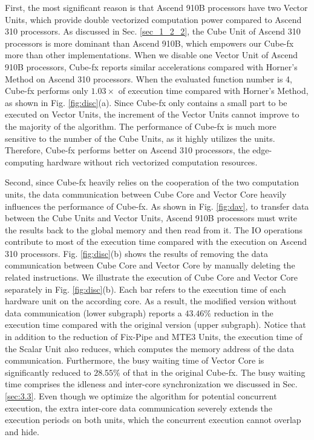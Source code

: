 First, the most significant reason is that Ascend 910B processors have two Vector Units, which provide double vectorized computation power compared to Ascend 310 processors. As discussed in Sec. \ref{sec_1_2_2}, the Cube Unit of Ascend 310 processors is more dominant than Ascend 910B, which empowers our Cube-fx more than other implementations. When we disable one Vector Unit of Ascend 910B processors, Cube-fx reports similar accelerations compared with Horner's Method on Ascend 310 processors. When the evaluated function number is 4, Cube-fx performs only $1.03\times$ of execution time compared with Horner's Method, as shown in Fig. \ref{fig:disc}(a). Since Cube-fx only contains a small part to be executed on Vector Units, the increment of the Vector Units cannot improve to the majority of the algorithm. The performance of Cube-fx is much more sensitive to the number of the Cube Units, as it highly utilizes the units. Therefore, Cube-fx performs better on Ascend 310 processors, the edge-computing hardware without rich vectorized computation resources.

Second, since Cube-fx heavily relies on the cooperation of the two computation units, the data communication between Cube Core and Vector Core heavily influences the performance of Cube-fx. As shown in Fig. \ref{fig:dav}, to transfer data between the Cube Units and Vector Units, Ascend 910B processors must write the results back to the global memory and then read from it. The IO operations contribute to most of the execution time compared with the execution on Ascend 310 processors. Fig. \ref{fig:disc}(b) shows the results of removing the data communication between Cube Core and Vector Core by manually deleting the related instructions. We illustrate the execution of Cube Core and Vector Core separately in Fig. \ref{fig:disc}(b). Each bar refers to the execution time of each hardware unit on the according core. As a result, the modified version without data communication (lower subgraph) reports a $43.46\%$ reduction in the execution time compared with the original version (upper subgraph). Notice that in addition to the reduction of Fix-Pipe and MTE3 Units, the execution time of the Scalar Unit also reduces, which computes the memory address of the data communication. Furthermore, the busy waiting time of Vector Core is significantly reduced to $28.55\%$ of that in the original Cube-fx. The busy waiting time comprises the idleness and inter-core synchronization we discussed in Sec. \ref{sec:3.3}. Even though we optimize the algorithm for potential concurrent execution, the extra inter-core data communication severely extends the execution periods on both units, which the concurrent execution cannot overlap and hide.

